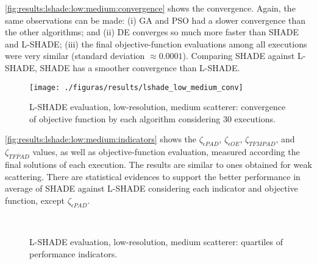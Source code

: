 			\autoref{fig:results:lshade:low:medium:convergence} shows the convergence. Again, the same observations can be made: (i) GA and PSO had a slower convergence than the other algorithms; and (ii) DE converges so much more faster than SHADE and L-SHADE; (iii) the final objective-function evaluations among all executions were very similar (standard deviation $\approx0.0001$). Comparing SHADE against L-SHADE, SHADE has a smoother convergence than L-SHADE.
		
			\begin{figure}
				\centering
				\texttt{[image: ./figuras/results/lshade\_low\_medium\_conv]}
				\caption[L-SHADE evaluation, low-resolution, medium scatterer: convergence.]{L-SHADE evaluation, low-resolution, medium scatterer: convergence of objective function by each algorithm considering 30 executions.}
				\label{fig:results:lshade:low:medium:convergence}
			\end{figure}
		
			\autoref{fig:results:lshade:low:medium:indicators} shows the $\zeta_{\epsilon PAD}$, $\zeta_{\epsilon OE}$, $\zeta_{TFMPAD}$, and $\zeta_{TFPAD}$ values, as well as objective-function evaluation, measured according the final solutions of each execution. The results are similar to ones obtained for weak scattering. There are statistical evidences to support the better performance in average of SHADE against L-SHADE considering each indicator and objective function, except $\zeta_{\epsilon PAD}$.
		
			\begin{figure}
				\centering
				 \\
				\caption[L-SHADE evaluation, low-resolution, medium scatterer: indicators.]{L-SHADE evaluation, low-resolution, medium scatterer: quartiles of performance indicators.}
				\label{fig:results:lshade:low:medium:indicators}
			\end{figure}
		
